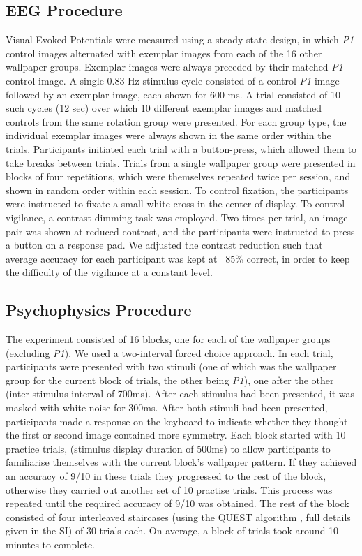 \documentclass[11pt, twoside]{article}
\begin{document}
\subsection*{EEG Procedure}
Visual Evoked Potentials were measured using a steady-state design, in which \textit{P1} control images alternated with exemplar images from each of the 16 other wallpaper groups. Exemplar images were always preceded by their matched \textit{P1} control image. A single 0.83 Hz stimulus cycle consisted of a control \textit{P1} image followed by an exemplar image, each shown for 600 ms. A trial consisted of 10 such cycles (12 sec) over which 10 different exemplar images and matched controls from the same rotation group were presented. For each group type, the individual exemplar images were always shown in the same order within the trials. Participants initiated each trial with a button-press, which allowed them to take breaks between trials. Trials from a single wallpaper group were presented in blocks of four repetitions, which were themselves repeated twice per session, and shown in random order within each session. To control fixation, the participants were instructed to fixate a small white cross in the center of display. To control vigilance, a contrast dimming task was employed. Two times per trial, an image pair was shown at reduced contrast, and the participants were instructed to press a button on a response pad. We adjusted the contrast reduction such that average accuracy for each participant was kept at ~85\% correct, in order to keep the difficulty of the vigilance at a constant level.

\subsection*{Psychophysics Procedure}
The experiment consisted of 16 blocks, one for each of the wallpaper groups (excluding \textit{P1}). We used a two-interval forced choice approach. In each trial, participants were presented with two stimuli (one of which was the wallpaper group for the current block of trials, the other being \textit{P1}), one after the other (inter-stimulus interval of 700ms). After each stimulus had been presented, it was masked with white noise for 300ms. After both stimuli had been presented, participants made a response on the keyboard to indicate whether they thought the first or second image contained more symmetry. Each block started with 10 practice trials, (stimulus display duration of 500ms) to allow participants to familiarise themselves with the current block's wallpaper pattern. If they achieved an accuracy of 9/10 in these trials they progressed to the rest of the block, otherwise they carried out another set of 10 practise trials. This process was repeated until the required accuracy of 9/10 was obtained. The rest of the block consisted of four interleaved staircases (using the QUEST algorithm \citep{watson1983quest}, full details given in the SI) of 30 trials each. On average, a block of trials took around 10 minutes to complete. 
\end{document}
